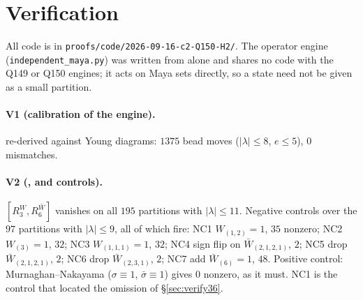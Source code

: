 \documentclass[11pt]{article}
\theoremstyle{definition}
\theoremstyle{remark}
\begin{document}
\section{Verification}\label{sec:ver}

All code is in \texttt{proofs/code/2026-09-16-c2-Q150-H2/}.  The operator engine
(\texttt{independent\_maya.py}) was written from \cite[Conv.~1.2]{Q149} alone and shares no code
with the Q149 or Q150 engines; it acts on Maya sets directly, so a state need not be given as a
small partition.

\paragraph{V1 (calibration of the engine).}  \cite[Lemma 1.3]{Q149} re-derived against Young
diagrams: $1375$ bead moves ($|\lambda|\le8$, $e\le5$), $0$ mismatches.

\paragraph{V2 (\cite[Thm.~6.7]{Q150c1}, and controls).}  $[R_3^{W},R_6^{\bar W}]$ vanishes on all
$195$ partitions with $|\lambda|\le11$.  Negative controls over the $97$ partitions with
$|\lambda|\le9$, all of which fire: NC1 $W_{(1,2)}{=}1$, $35$ nonzero; NC2 $W_{(3)}{=}1$, $32$;
NC3 $W_{(1,1,1)}{=}1$, $32$; NC4 sign flip on $\bar W_{(2,1,2,1)}$, $2$; NC5 drop
$\bar W_{(2,1,2,1)}$, $2$; NC6 drop $\bar W_{(2,3,1)}$, $2$; NC7 add $\bar W_{(6)}{=}1$, $48$.
Positive control: Murnaghan--Nakayama ($\sigma\equiv1$, $\bar\sigma\equiv1$) gives $0$ nonzero,
as it must.  NC1 is the control that located the omission of \S\ref{sec:verify36}.
\end{document}
